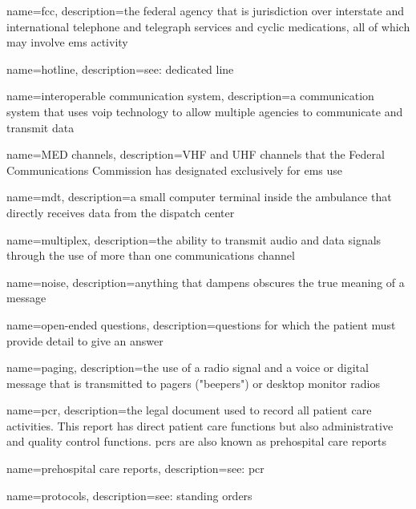 \documentclass[../../EMT-169.tex]{subfiles}
\begin{document}
	{
		name=\acrfull{fcc},
		description={the federal agency that is jurisdiction over interstate and international telephone and telegraph services and cyclic medications, all of which may involve \acrshort{ems} activity}
	}
	
	{
		name=hotline,
		description={see: dedicated line}
	}
	
	{
		name=interoperable communication system,
		description={a communication system that uses \acrfull{voip} technology to allow multiple agencies to communicate and transmit data}
	}
	
	{
		name=MED channels,
		description={VHF and UHF channels that the Federal Communications Commission has designated exclusively for \acrshort{ems} use}
	}
	
	{
		name=\acrfull{mdt},
		description={a small computer terminal inside the ambulance that directly receives data from the dispatch center}
	}
	
	{
		name=multiplex,
		description={the ability to transmit audio and data signals through the use of more than one communications channel}
	}
	
	{
		name=noise,
		description={anything that dampens obscures the true meaning of a message}
	}
	
	{
		name=open-ended questions,
		description={questions for which the patient must provide detail to give an answer}
	}
	
	{
		name=paging,
		description={the use of a radio signal and a voice or digital message that is transmitted to pagers ("beepers") or desktop monitor radios}
	}
	
	{
		name=\acrfull{pcr},
		description={the legal document used to record all patient care activities.  This report has direct patient care functions but also administrative and quality control functions.  \acrshort{pcr}s are also known as prehospital care reports}
	}
	
	{
		name=prehospital care reports,
		description={see: \acrfull{pcr}}
	}
	
	{
		name=protocols,
		description={see: standing orders}
	}
	
\end{document}
